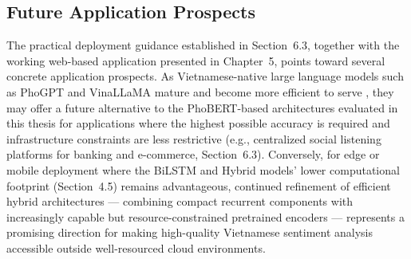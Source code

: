 \documentclass[12pt]{report} %
\begin{document}
\subsection{Future Application Prospects}
The practical deployment guidance established in Section~6.3, together with the working web-based application presented in Chapter~5, points toward several concrete application prospects. As Vietnamese-native large language models such as PhoGPT and VinaLLaMA mature and become more efficient to serve \cite{nguyen2023phogpt, nguyen2023vinallama}, they may offer a future alternative to the PhoBERT-based architectures evaluated in this thesis for applications where the highest possible accuracy is required and infrastructure constraints are less restrictive (e.g., centralized social listening platforms for banking and e-commerce, Section~6.3). Conversely, for edge or mobile deployment where the BiLSTM and Hybrid models' lower computational footprint (Section~4.5) remains advantageous, continued refinement of efficient hybrid architectures --- combining compact recurrent components with increasingly capable but resource-constrained pretrained encoders --- represents a promising direction for making high-quality Vietnamese sentiment analysis accessible outside well-resourced cloud environments.




\cleardoublepage
{}



\cleardoublepage
\appendix
{}
\setcounter{page}{1}
\end{document}

